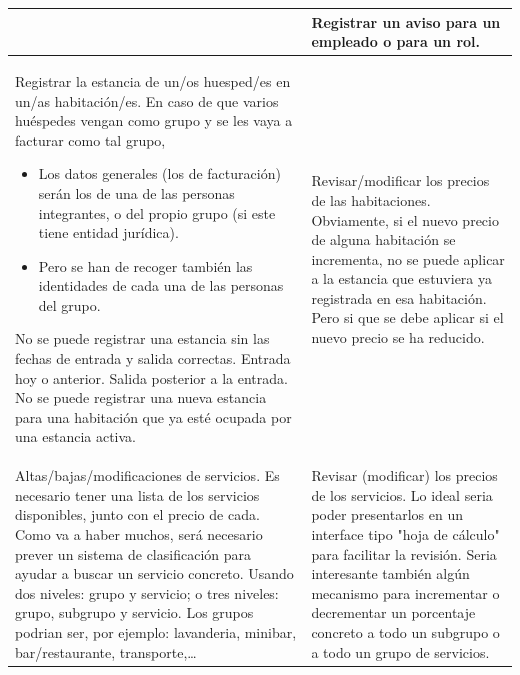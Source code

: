 \documentclass[spanish,12pt,a4paper,final,oneside]{book}
\begin{document}
\begin{longtable}{|p{7cm}|p{7cm}|}
&

Registrar un aviso para un empleado o para un rol.

\\ \hline

Registrar la estancia de un/os huesped/es en un/as habitación/es. 
\newline \newline
En caso de que varios huéspedes vengan como grupo y se les vaya a facturar como tal grupo,
\begin{itemize}
\item Los datos generales (los de facturación) serán los de una de las personas integrantes, o del propio grupo (si este tiene entidad jurídica).
\item Pero se han de recoger también las identidades de cada una de las personas del grupo.
\end{itemize}
\vspace{0.3cm}
No se puede registrar una estancia sin las fechas de entrada y salida correctas. Entrada hoy o anterior. Salida posterior a la entrada.
\newline \newline
No se puede registrar una nueva estancia para una habitación que ya esté ocupada por una estancia activa.

&
Revisar/modificar los precios de las habitaciones.
\newline \newline
Obviamente, si el nuevo precio de alguna habitación se incrementa, no se puede aplicar a la estancia que estuviera ya registrada en esa habitación. Pero si que se debe aplicar si el nuevo precio se ha reducido.


\\ \hline

Altas/bajas/modificaciones de servicios.
\newline \newline
Es necesario tener una lista de los servicios disponibles, junto con el precio de cada.
\newline \newline
Como va a haber muchos, será necesario prever un sistema de clasificación para ayudar a buscar un servicio concreto. Usando dos niveles: grupo y servicio; o tres niveles: grupo, subgrupo y servicio.
\newline
Los grupos podrian ser, por ejemplo: lavanderia, minibar, bar/restaurante, transporte,\ldots 

&

Revisar (modificar) los precios de los servicios.
\newline \newline
Lo ideal seria poder presentarlos en un interface tipo "hoja de cálculo" para facilitar la revisión.
\newline \newline
Seria interesante también algún mecanismo para incrementar o decrementar un porcentaje concreto a todo un subgrupo o a todo un grupo de servicios.


\end{longtable}
\end{document}

